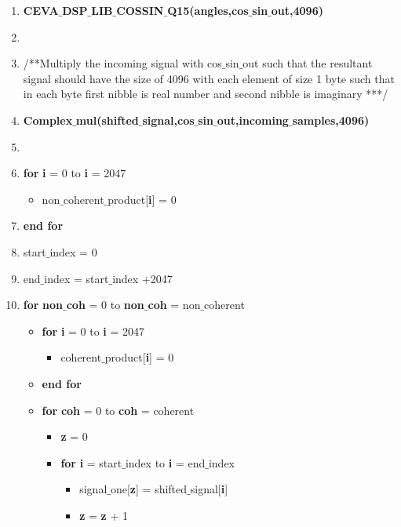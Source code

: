 \documentclass[journal,10pt,onecolumn]{article}
\begin{document}
\begin{enumerate}
\begin{enumerate}
        \item[] \textbf{CEVA$\_$DSP$\_$LIB$\_$COSSIN$\_$Q15(angles,cos$\_$sin$\_$out,4096)}
        \item[]
        \item[] /**Multiply the incoming signal with cos$\_$sin$\_$out such that the resultant signal should have the size of 4096 with each element of size 1 byte such that in each byte first nibble is real number and second nibble is imaginary ***/
        \item[] \textbf{Complex$\_$mul(shifted$\_$signal,cos$\_$sin$\_$out,incoming$\_$samples,4096)}
        \item[] 
        \item[] \textbf{for}  \textbf{i} = 0 to \textbf{i} = 2047
        \begin{itemize}
            \item[] non$\_$coherent$\_$product[\textbf{i}] = 0
        \end{itemize}
        \item[] \textbf{end for}
        \item[] start$\_$index = 0
        \item[] end$\_$index = start$\_$index +2047
        \item[] \textbf{for}  \textbf{non$\_$coh} = 0 to  \textbf{non$\_$coh} =  non$\_$coherent
        \begin{itemize}
            \item[] \textbf{for}  \textbf{i} = 0 to \textbf{i} = 2047
            \begin{itemize}
                \item[] coherent$\_$product[\textbf{i}] = 0
            \end{itemize}
            \item[] \textbf{end for}
            \item[] \textbf{for} \textbf{coh} = 0 to  \textbf{coh} = coherent
            \begin{itemize}
                \item[] \textbf{z} = 0
                \item[] \textbf{for} \textbf{i} =  start$\_$index to  \textbf{i} = end$\_$index 
                \begin{itemize}
                    \item[] signal$\_$one[\textbf{z}] = shifted$\_$signal[\textbf{i}]
                    \item[] \textbf{z} = \textbf{z} + 1
                \end{itemize}

\end{itemize}
\end{itemize}
\end{enumerate}
\end{enumerate}
\end{document}
